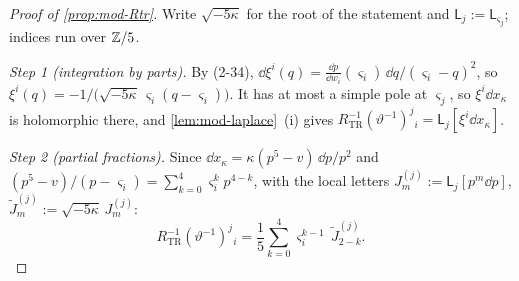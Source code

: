 \begin{proof}[Proof of \cref{prop:mod-Rtr}]
Write $\sqrt{-5\kappa}$ for the root of the statement and $\mathsf L_j:=\mathsf L_{\varsigma_j}$; indices run over $\mathbb{Z}/5$.

\emph{Step 1 (integration by parts).} By (2-34), $\dd\xi^i(q)=\frac{\dd p}{\dd w_i}(\varsigma_i)\,\dd q/(\varsigma_i-q)^2$, so $\xi^i(q)=-1/\big(\sqrt{-5\kappa}\,\varsigma_i(q-\varsigma_i)\big)$. It has at most a simple pole at $\varsigma_j$, so $\xi^i\dd x_\kappa$ is holomorphic there, and \cref{lem:mod-laplace}~(i) gives $R_{\mathrm{TR}}^{-1}(\vartheta^{-1})^j{}_i=\mathsf L_j[\xi^i\dd x_\kappa]$.

\emph{Step 2 (partial fractions).} Since $\dd x_\kappa=\kappa(p^5-v)\,\dd p/p^2$ and $(p^5-v)/(p-\varsigma_i)=\sum_{k=0}^4\varsigma_i^kp^{4-k}$, with the local letters $J^{(j)}_m:=\mathsf L_j[p^m\dd p]$, $\tilde J^{(j)}_m:=\sqrt{-5\kappa}\,J^{(j)}_m$:
\begin{equation}
\label{eq:mod-Rtr-pf}
R_{\mathrm{TR}}^{-1}(\vartheta^{-1})^j{}_i=\frac15\sum_{k=0}^4\varsigma_i^{k-1}\,\tilde J^{(j)}_{2-k}.
\end{equation}


\end{proof}

